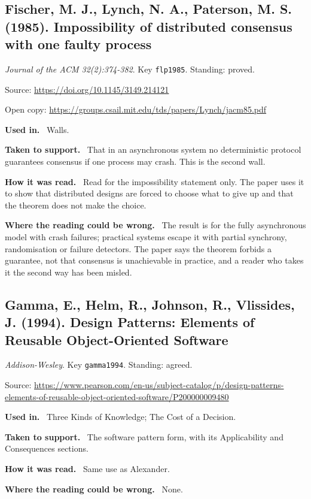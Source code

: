 \documentclass[11pt,oneside]{article}
\newcommand{\field}[1]{\par\noindent\textbf{\color{accent}#1.}\ }
\begin{document}
\hypertarget{src:flp1985}{}
\subsection*{Fischer, M. J., Lynch, N. A., Paterson, M. S. (1985). Impossibility of distributed consensus with one faulty process}
\noindent\small\emph{Journal of the ACM 32(2):374-382}. Key \texttt{flp1985}. Standing: proved.
\par\noindent\small Source: \url{https://doi.org/10.1145/3149.214121}
\par\noindent\small Open copy: \url{https://groups.csail.mit.edu/tds/papers/Lynch/jacm85.pdf}
\normalsize
\field{Used in} Walls.
\field{Taken to support} That in an asynchronous system no deterministic protocol guarantees consensus if one process may crash. This is the second wall.
\field{How it was read} Read for the impossibility statement only. The paper uses it to show that distributed designs are forced to choose what to give up and that the theorem does not make the choice.
\field{Where the reading could be wrong} The result is for the fully asynchronous model with crash failures; practical systems escape it with partial synchrony, randomisation or failure detectors. The paper says the theorem forbids a guarantee, not that consensus is unachievable in practice, and a reader who takes it the second way has been misled.

\hypertarget{src:gamma1994}{}
\subsection*{Gamma, E., Helm, R., Johnson, R., Vlissides, J. (1994). Design Patterns: Elements of Reusable Object-Oriented Software}
\noindent\small\emph{Addison-Wesley}. Key \texttt{gamma1994}. Standing: agreed.
\par\noindent\small Source: \url{https://www.pearson.com/en-us/subject-catalog/p/design-patterns-elements-of-reusable-object-oriented-software/P200000009480}
\normalsize
\field{Used in} Three Kinds of Knowledge; The Cost of a Decision.
\field{Taken to support} The software pattern form, with its Applicability and Consequences sections.
\field{How it was read} Same use as Alexander.
\field{Where the reading could be wrong} None.

\hypertarget{src:gandy1980}{}
\end{document}
